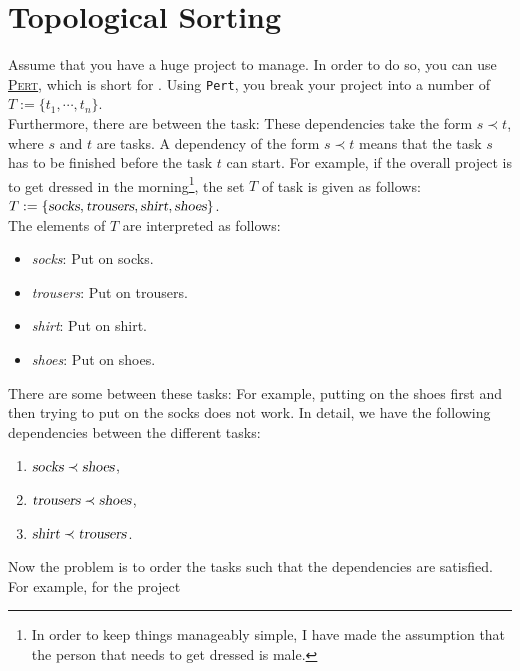 \section{Topological Sorting}
Assume that you have a huge project to manage.  In order to do so, you can use 
\href{https://en.wikipedia.org/wiki/Program_evaluation_and_review_technique}{\textsc{Pert}}, which is short for
.  Using \texttt{Pert},
you break your project into a number of 
\\[0.2cm]
\hspace*{1.3cm}
$T := \{t_1,\cdots,t_n\}$.  
\\[0.2cm]
Furthermore, there are  between the task: These dependencies take the form $s \prec t$, where $s$ and
$t$ are tasks.  A dependency of the form $s \prec t$ means that the task $s$ has to be finished before the task $t$
can start.  For example, if the overall project is to get dressed in the morning\footnote{
  In order to keep things manageably simple, I have made the assumption that the person that needs to get dressed is male.
}, the set $T$ of task is given
as follows:
\\[0.2cm]
\hspace*{1.3cm}
$T := \{ \textsl{socks}, \textsl{trousers}, \textsl{shirt}, \textsl{shoes} \}$.
\\[0.2cm]
The elements of $T$ are interpreted as follows:
\begin{itemize}
\item \textsl{socks}: Put on socks.
\item \textsl{trousers}: Put on trousers.
\item \textsl{shirt}: Put on shirt.
\item \textsl{shoes}: Put on shoes.
\end{itemize}
There are some  between these tasks:  For example, putting on the shoes first and then trying to
put on the socks does not work.  In detail, we have the following dependencies between the different tasks:
\begin{enumerate}
\item $\textsl{socks} \prec \textsl{shoes}$,
\item $\textsl{trousers} \prec \textsl{shoes}$,
\item $\textsl{shirt} \prec \textsl{trousers}$.
\end{enumerate}
Now the problem is to order the tasks such that the dependencies are satisfied.  For example, for the project
